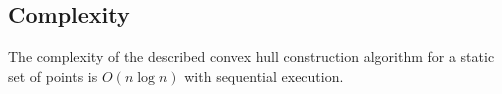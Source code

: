 \documentclass[a4paper,english,numberwithinsect,notab]{eurocg20-submission}
\begin{document}
\subsection{Complexity}



	\begin{theorem}
		The complexity of the described convex hull construction algorithm for a static set of points is $O(n\log n)$ with sequential execution.
	\end{theorem}
	
\end{document}
